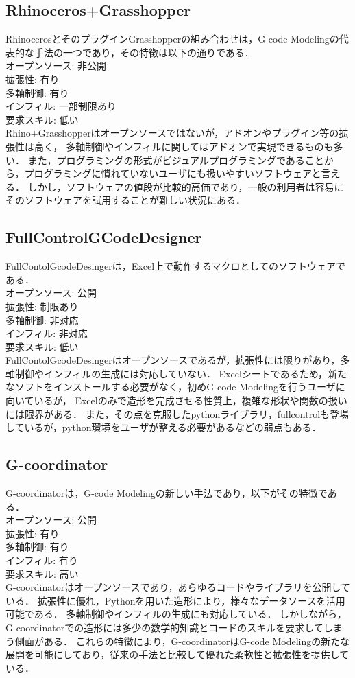 \documentclass{article}
\begin{document}
\begin{twocolumn}
\subsection{Rhinoceros+Grasshopper}
RhinocerosとそのプラグインGrasshopperの組み合わせは，G-code Modelingの代表的な手法の一つであり，その特徴は以下の通りである．\\
オープンソース: 非公開\\
拡張性: 有り\\
多軸制御: 有り\\
インフィル: 一部制限あり\\
要求スキル: 低い\\
Rhino+Grasshopperはオープンソースではないが，アドオンやプラグイン等の拡張性は高く，
多軸制御やインフィルに関してはアドオンで実現できるものも多い．
また，プログラミングの形式がビジュアルプログラミングであることから，プログラミングに慣れていないユーザにも扱いやすいソフトウェアと言える．
しかし，ソフトウェアの値段が比較的高価であり，一般の利用者は容易にそのソフトウェアを試用することが難しい状況にある．

\subsection{FullControlGCodeDesigner}
FullContolGcodeDesinger\cite{gleadall2021fullcontrol}は，Excel上で動作するマクロとしてのソフトウェアである．\\
オープンソース: 公開\\
拡張性: 制限あり\\
多軸制御: 非対応\\
インフィル: 非対応\\
要求スキル: 低い\\
FullContolGcodeDesingerはオープンソースであるが，拡張性には限りがあり，多軸制御やインフィルの生成には対応していない．
Excelシートであるため，新たなソフトをインストールする必要がなく，初めG-code Modelingを行うユーザに向いているが，
Excelのみで造形を完成させる性質上，複雑な形状や関数の扱いには限界がある．
また，その点を克服したpythonライブラリ，fullcontrolも登場しているが，python環境をユーザが整える必要があるなどの弱点もある．

\subsection{G-coordinator}
G-coordinatorは，G-code Modelingの新しい手法であり，以下がその特徴である．\\
オープンソース: 公開\\
拡張性: 有り\\
多軸制御: 有り\\
インフィル: 有り\\
要求スキル: 高い\\
G-coordinatorはオープンソースであり，あらゆるコードやライブラリを公開している．
拡張性に優れ，Pythonを用いた造形により，様々なデータソースを活用可能である．
多軸制御やインフィルの生成にも対応している．
しかしながら，G-coordinatorでの造形には多少の数学的知識とコードのスキルを要求してしまう側面がある．
これらの特徴により，G-coordinatorはG-code Modelingの新たな展開を可能にしており，従来の手法と比較して優れた柔軟性と拡張性を提供している．


\end{twocolumn}
\end{document}
